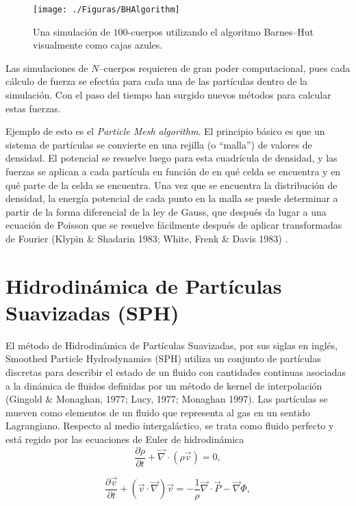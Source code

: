 \documentclass[a4paper,openright,12pt]{book}
\begin{document}
\begin{figure}
\centering
  \texttt{[image: ./Figuras/BHAlgorithm]}
  \caption{\footnotesize{Una simulación de $100$-cuerpos utilizando el algoritmo Barnes--Hut visualmente como cajas azules.}}
  \label{fig 2.1}
\end{figure}

Las simulaciones de $N$--cuerpos requieren de gran poder computacional, pues cada cálculo de fuerza se efectúa para cada una de las partículas dentro de la simulación. Con el paso del tiempo han surgido nuevos métodos para calcular estas fuerzas. 

Ejemplo de esto es el \textit{Particle Mesh algorithm}. El principio básico es que un sistema de partículas se convierte en una rejilla (o ``malla'') de valores de densidad. El potencial se resuelve luego para esta cuadrícula de densidad, y las fuerzas se aplican a cada partícula en función de en qué celda se encuentra y en qué parte de la celda se encuentra. Una vez que se encuentra la distribución de densidad, la energía potencial de cada punto en la malla se puede determinar a partir de la forma diferencial de la ley de Gauss, que después da lugar a una ecuación de Poisson que se resuelve fácilmente después de aplicar transformadas de Fourier (Klypin \& Shadarin 1983; White, Frenk \& Davis 1983) \cite{b5.1, b5.2}.




\section{Hidrodinámica de Partículas Suavizadas (SPH)}

El método de Hidrodinámica de Partículas Suavizadas, por sus siglas en inglés, Smoothed Particle Hydrodynamics (SPH) utiliza un conjunto de partículas discretas para describir el estado de un fluido con cantidades continuas asociadas a la dinámica de fluidos definidas por un método de kernel de interpolación (Gingold \& Monaghan, 1977; Lucy, 1977; Monaghan 1997)\cite{b6,b7}. Las partículas se mueven como elementos de un fluido que representa al gas en un sentido Lagrangiano. Respecto al medio intergaláctico, se trata como fluido perfecto y está regido por las ecuaciones de Euler de hidrodinámica 
\begin{equation}
 \frac{\partial\rho}{\partial t}
 +
 \vec{\nabla}\cdot(\rho\vec{v})
 = 0,\label{eqn2.15}
\end{equation}

\begin{equation}
 \frac{\partial\vec{v}}{\partial t}
 +
 (\vec{v}\cdot\vec{\nabla})\vec{v}
 =
 -\frac{1}{\rho} \vec{\nabla}\cdot\vec{P} - \vec{\nabla}\Phi,\label{eqn2.16}
\end{equation}
\end{document}
